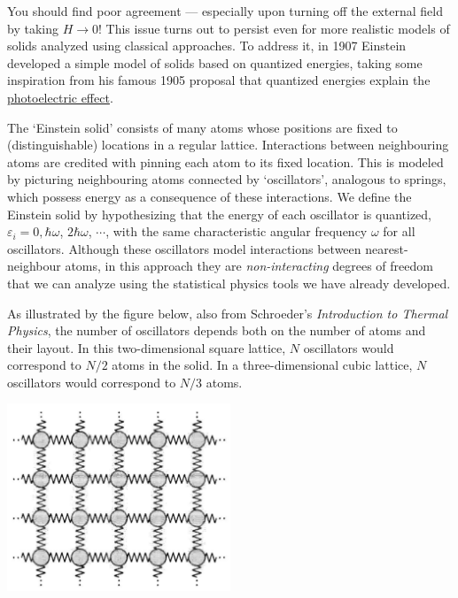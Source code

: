 \documentclass[12 pt]{article} %
\newcommand{\eps}{\ensuremath{\varepsilon} }
\newcommand{\om}{\ensuremath{\omega} }
\begin{document}
You should find poor agreement --- especially upon turning off the external field by taking $H \to 0$!
This issue turns out to persist even for more realistic models of solids analyzed using classical approaches.
To address it, in 1907 Einstein developed a simple model of solids based on quantized energies, taking some inspiration from his famous 1905 proposal that quantized energies explain the \href{https://en.wikipedia.org/wiki/Photoelectric_effect}{photoelectric effect}.

\newpage %
The `Einstein solid' consists of many atoms whose positions are fixed to (distinguishable) locations in a regular lattice.
Interactions between neighbouring atoms are credited with pinning each atom to its fixed location.
This is modeled by picturing neighbouring atoms connected by `oscillators', analogous to springs, which possess energy as a consequence of these interactions.
We define the Einstein solid by hypothesizing that the energy of each oscillator is quantized, $\eps_i = 0, \hbar \om$, $2\hbar \om$, $\cdots$, with the same characteristic angular frequency \om for all oscillators.
Although these oscillators model interactions between nearest-neighbour atoms, in this approach they are \textit{non-interacting} degrees of freedom that we can analyze using the statistical physics tools we have already developed.

As illustrated by the figure below, also from Schroeder's \textit{Introduction to Thermal Physics}, the number of oscillators depends both on the number of atoms and their layout.
In this two-dimensional square lattice, $N$ oscillators would correspond to $N / 2$ atoms in the solid.
In a three-dimensional cubic lattice, $N$ oscillators would correspond to $N / 3$ atoms. \\[-24 pt]
\begin{center}\includegraphics[width=0.5\textwidth]{figs/solid.pdf}\end{center}
\end{document}
